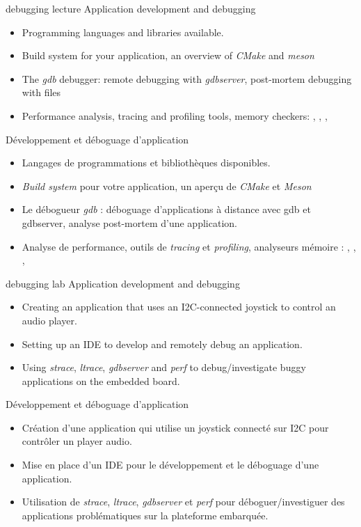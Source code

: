 {debugging}
{lecture}
{Application development and debugging}
{
  \begin{itemize}
  \item Programming languages and libraries available.
  \item Build system for your application, an overview of {\em CMake}
    and {\em meson}
  \item The {\em gdb} debugger: remote debugging with {\em gdbserver},
    post-mortem debugging with  files
  \item Performance analysis, tracing and profiling tools, memory
    checkers: , , ,
  \end{itemize}
}
{Développement et déboguage d'application}
{
  \begin{itemize}
  \item Langages de programmations et bibliothèques disponibles.
  \item {\em Build system} pour votre application, un aperçu de {\em
      CMake} et {\em Meson}
  \item Le débogueur {\em gdb} : déboguage d'applications à distance
    avec gdb et gdbserver, analyse post-mortem d'une application.
  \item Analyse de performance, outils de {\em tracing} et {\em
      profiling}, analyseurs mémoire : , ,
    , 
  \end{itemize}
}
{debugging}
{lab}
{Application development and debugging}
{
  \begin{itemize}
  \item Creating an application that uses an I2C-connected joystick to
    control an audio player.
  \item Setting up an IDE to develop and remotely debug an
    application.
  \item Using {\em strace}, {\em ltrace}, {\em gdbserver} and {\em
      perf} to debug/investigate buggy applications on the embedded
    board.
  \end{itemize}
}
{Développement et déboguage d'application}
{
  \begin{itemize}
  \item Création d'une application qui utilise un joystick connecté
    sur I2C pour contrôler un player audio.
  \item Mise en place d'un IDE pour le développement et le déboguage
    d'une application.
  \item Utilisation de {\em strace}, {\em ltrace}, {\em gdbserver} et
    {\em perf} pour déboguer/investiguer des applications
    problématiques sur la plateforme embarquée.
  \end{itemize}
}
